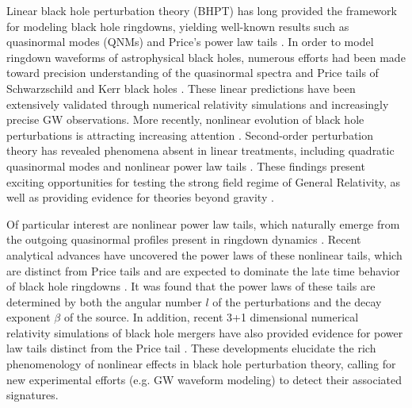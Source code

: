 Linear black hole perturbation theory (BHPT) has long provided the framework for modeling black hole ringdowns, yielding well-known results such as quasinormal modes (QNMs) and Price’s power law tails \cite{Price:1971fb,Price:1972pw,Leaver:1986gd,Gundlach:1993tp,Gundlach:1993tn,Ching:1995tj,Chandrasekhar:1975zza,Martel:2005ir,Berti:2009kk}.
In order to model ringdown waveforms of astrophysical black holes, numerous efforts had been made toward precision understanding of the quasinormal spectra and Price tails of Schwarzschild and Kerr black holes \cite{Ching:1994bd,Krivan:1996da,Krivan:1997hc,Krivan:1999wh,Burko:2002bt,Burko:2007ju,Hod:2009my,Burko:2010zj,Racz:2011qu,Zenginoglu:2012us,Burko:2013bra,Baibhav:2023clw}.
These linear predictions have been extensively validated through numerical relativity simulations and increasingly precise GW observations.
More recently, nonlinear evolution of black hole perturbations is attracting increasing attention \cite{Sberna:2021eui,Redondo-Yuste:2023seq,Mitman:2022qdl,Cheung:2022rbm,Ioka:2007ak,Redondo-Yuste:2023ipg,Bourg:2024jme,Lagos:2024ekd,Perrone:2023jzq}.
Second-order perturbation theory has revealed phenomena absent in linear treatments, including quadratic quasinormal modes and nonlinear power law tails \cite{Gleiser:1995gx,Gleiser:1998rw,Campanelli:1998jv,Garat:1999vr,Zlochower:2003yh,Brizuela:2006ne,Brizuela:2007zza,Nakano:2007cj,Brizuela:2009qd,Ripley:2020xby,Loutrel:2020wbw,Pazos:2010xf,Khera:2023oyf,Bucciotti:2023ets,Spiers:2023cip,Ma:2024qcv,Zhu:2024rej}.
These findings present exciting opportunities for testing the strong field regime of General Relativity, as well as providing evidence for theories beyond gravity \cite{Berti:2015itd,Berti:2018vdi,Franciolini:2018uyq,LIGOScientific:2020tif,Khera:2024yrk}.


Of particular interest are nonlinear power law tails, which naturally emerge from the outgoing quasinormal profiles present in ringdown dynamics \cite{Okuzumi:2008ej,Lagos:2022otp}.
Recent analytical advances have uncovered the power laws of these nonlinear tails, which are distinct from Price tails and are expected to dominate the late time behavior of black hole ringdowns \cite{Cardoso:2024jme}.
It was found that the power laws of these tails are determined by both the angular number $l$ of the perturbations and the decay exponent $\beta$ of the source.
In addition, recent 3+1 dimensional numerical relativity simulations of black hole mergers have also provided evidence for power law tails distinct from the Price tail \cite{DeAmicis:2024eoy,Ma:2024hzq}.
These developments elucidate the rich phenomenology of nonlinear effects in black hole perturbation theory, calling for new experimental efforts (e.g. GW waveform modeling) to detect their associated signatures.


